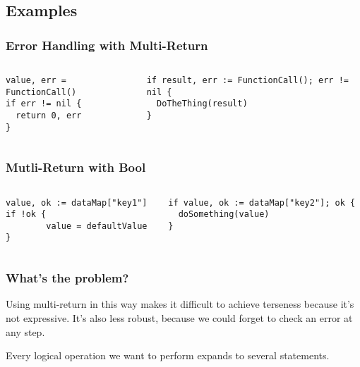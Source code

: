 \documentclass{beamer}
\begin{document}
\subsection{Examples}
\begin{frame}[fragile]
  \frametitle{Error Handling with Multi-Return}
  \begin{columns}[T]
    \begin{column}{.48\textwidth}
\begin{lstlisting}
value, err = FunctionCall()
if err != nil {
  return 0, err
}
\end{lstlisting}
    \end{column}
    \hfill%
    \begin{column}{.48\textwidth}
\begin{lstlisting}
if result, err := FunctionCall(); err != nil {
  DoTheThing(result)
}
\end{lstlisting}
    \end{column}
  \end{columns}
\end{frame}

\begin{frame}[fragile]
  \frametitle{Mutli-Return with Bool}
  \begin{columns}[T]
    \begin{column}{.48\textwidth}
\begin{lstlisting}
value, ok := dataMap["key1"]
if !ok {
        value = defaultValue
}
\end{lstlisting}
    \end{column}
    \hfill
    \begin{column}{.48\textwidth}
\begin{lstlisting}
if value, ok := dataMap["key2"]; ok {
  doSomething(value)
}
\end{lstlisting}
    \end{column}
  \end{columns}
\end{frame}

\begin{frame}
  \frametitle{What's the problem?}
  Using multi-return in this way makes it difficult to achieve
  terseness because it's not expressive.  It's also less robust,
  because we could forget to check an error at any step.

  \vfill

  Every logical operation we want to perform expands to several
  statements.
\end{frame}
\end{document}
